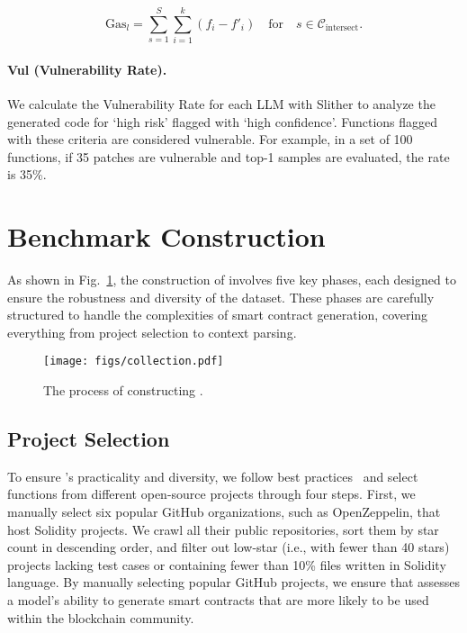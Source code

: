 \begin{equation}
\text{Gas}_{l} = \sum_{s=1}^{S} \sum_{i=1}^{k} (f_i - f'_i) \quad \text{for} \quad s \in \mathcal{C}_{\text{intersect}}.
\end{equation}


\noindent
\paragraph{Vul (Vulnerability Rate).}  
We calculate the Vulnerability Rate for each LLM with Slither to analyze the generated code for `high risk' flagged with `high confidence'. 
Functions flagged with these criteria are considered vulnerable.
For example, in a set of 100 functions, if 35 patches are vulnerable and top-1 samples are evaluated, the rate is 35\%.


\section{Benchmark Construction}

As shown in Fig.~\ref{fig:collection}, the construction of \datasetname involves five key phases, each designed to ensure the robustness and diversity of the dataset. These phases are carefully structured to handle the complexities of smart contract generation, covering everything from project selection to context parsing.


\begin{figure}
    \centering
    \texttt{[image: figs/collection.pdf]}
    \caption{The process of constructing \datasetname.}
    \label{fig:collection}
\end{figure}


\subsection{Project Selection}
\label{sec:project_select}
To ensure \datasetname's practicality and diversity, we follow best practices~\cite{chen2021evaluating,yu2024codereval,liu2024your} and select functions from different open-source projects through four steps. 
First, we manually select six popular GitHub organizations, such as OpenZeppelin, that host Solidity projects.
We crawl all their public repositories, sort them by star count in descending order, and filter out low-star (i.e., with fewer than 40 stars) projects lacking test cases or containing fewer than 10\% files written in Solidity language. By manually selecting popular GitHub projects, we ensure that \datasetname assesses a model’s ability to generate smart contracts that are more likely to be used within the blockchain community.

